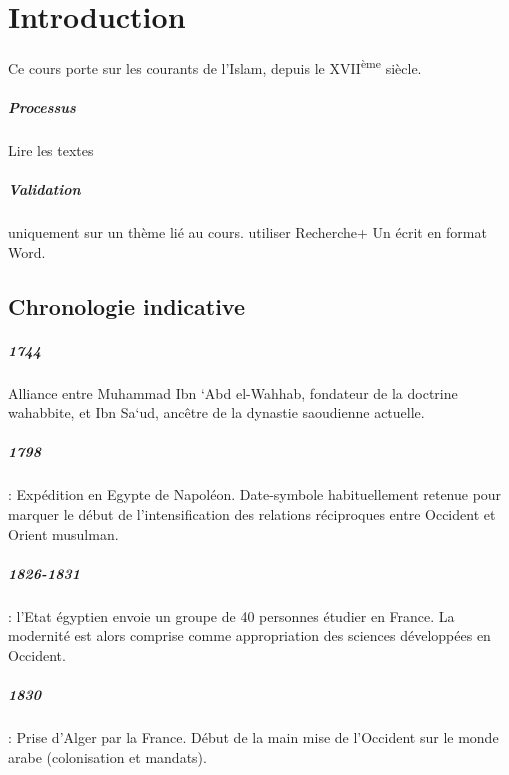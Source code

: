 \chapter{Introduction}


Ce cours porte sur les courants de l'Islam, depuis le XVII\textsuperscript{ème} siècle.

\paragraph{Processus}
Lire les textes


\paragraph{Validation} uniquement sur un thème lié au cours. utiliser Recherche+
Un écrit en format Word.



\section{Chronologie indicative}

 
\paragraph{1744 } Alliance entre Muhammad Ibn ‘Abd el-Wahhab, fondateur de la doctrine wahabbite, et Ibn Sa‘ud, ancêtre de la dynastie saoudienne actuelle.

\paragraph{1798} : Expédition en Egypte de Napoléon. Date-symbole habituellement retenue pour marquer le début de l’intensification des relations réciproques entre Occident et Orient musulman.
\paragraph{1826-1831 }: l’Etat égyptien envoie un groupe de 40 personnes étudier en France. La modernité est alors comprise comme appropriation des sciences développées en Occident.
\paragraph{1830 } : Prise d’Alger par la France. Début de la main mise de l’Occident sur le monde arabe (colonisation et mandats).
